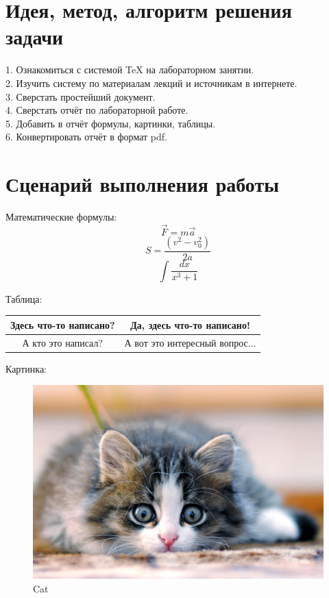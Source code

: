 \documentclass{article}
\begin{document}
\section{Идея, метод, алгоритм решения задачи}
1. Ознакомиться с системой TeX на лабораторном занятии. \\
2. Изучить систему по материалам лекций и источникам в интернете. \\
3. Сверстать простейший документ. \\
4. Сверстать отчёт по лабораторной работе. \\
5. Добавить в отчёт формулы, картинки, таблицы. \\
6. Конвертировать отчёт в формат pdf. \\

\section{Сценарий выполнения работы}

Математические формулы: \\
\begin{equation}
    \vec{F}=m\vec{a}
\end{equation}
\begin{equation}
    S=\frac{(v^2 - v_0^2)}{2a}
\end{equation}
\begin{equation}
    \int \frac{d x}{x^3+1}
\end{equation}

Таблица:
\begin{center}
    \begin{tabular}{|c|c|}
        \hline
         Здесь что-то написано? & Да, здесь что-то написано! \\
        \hline
         А кто это написал? & А вот это интересный вопрос... \\
        \hline
    \end{tabular}
\end{center}

Картинка:
\begin{figure}[h!]
    \centering
    \includegraphics[width=0.8\linewidth]{cat.jpg}
    \caption{Cat}
    \label{fig:Cat}
\end{figure} \\
\end{document}
